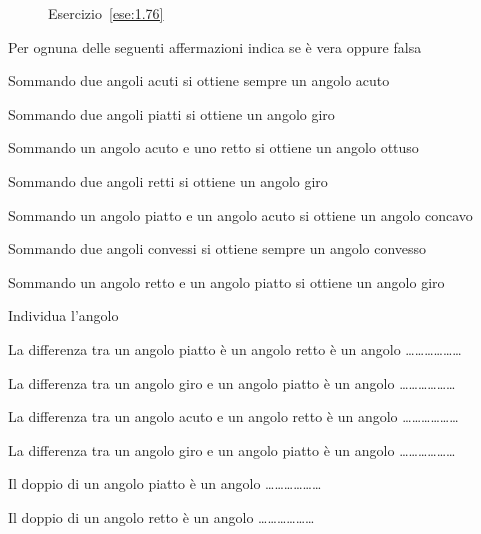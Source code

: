 \begin{inaccessibleblock}
 \begin{figure}[htb]
 \centering
 \caption{Esercizio~\ref{ese:1.76}}%
\end{figure}
\end{inaccessibleblock}

\begin{esercizio}
Per ognuna delle seguenti affermazioni indica se è vera oppure falsa
\begin{enumeratea}
\item Sommando due angoli acuti si ottiene sempre un angolo 
acuto		\hfill\boxV\quad\boxF
\item Sommando due angoli piatti si ottiene un angolo giro	
			\hfill\boxV\quad\boxF
\item Sommando un angolo acuto e uno retto si ottiene un angolo 
ottuso	\hfill\boxV\quad\boxF
\item Sommando due angoli retti si ottiene un angolo giro	
			\hfill\boxV\quad\boxF
\item Sommando un angolo piatto e un angolo acuto si ottiene un 
angolo concavo	\hfill\boxV\quad\boxF
\item Sommando due angoli convessi si ottiene sempre un angolo 
convesso	\hfill\boxV\quad\boxF
\item Sommando un angolo retto e un angolo piatto si ottiene un 
angolo giro		\hfill\boxV\quad\boxF
\end{enumeratea}
\end{esercizio}

\begin{esercizio}
Individua l'angolo
\begin{enumeratea}
\item La differenza tra un angolo piatto è un angolo retto è un 
angolo \ldots\ldots\ldots\ldots\ldots\ldots{}
\item La differenza tra un angolo giro e un angolo piatto è un angolo 
\ldots\ldots\ldots\ldots\ldots\ldots{}
\item La differenza tra un angolo acuto e un angolo retto è un angolo 
\ldots\ldots\ldots\ldots\ldots\ldots{}
\item La differenza tra un angolo giro e un angolo piatto è un angolo 
\ldots\ldots\ldots\ldots\ldots\ldots{}
\item Il doppio di un angolo piatto è un angolo 
\ldots\ldots\ldots\ldots\ldots\ldots{}
\item Il doppio di un angolo retto è un angolo 
\ldots\ldots\ldots\ldots\ldots\ldots{}
\end{enumeratea}
\end{esercizio}
	

